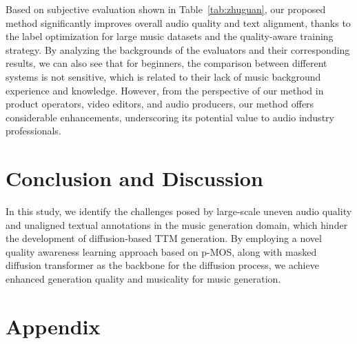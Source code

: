 Based on subjective evaluation shown in Table~\ref{tab:zhuguan}, our proposed method significantly improves overall audio quality and text alignment, thanks to the label optimization for large music datasets and the quality-aware training strategy. By analyzing the backgrounds of the evaluators and their corresponding results, we can also see that for beginners, the comparison between different systems is not sensitive, which is related to their lack of music background experience and knowledge. However, from the perspective of our method in product operators, video editors, and audio producers, our method offers considerable enhancements, underscoring its potential value to audio industry professionals.
\section{Conclusion and Discussion}\label{sec:dis}

In this study, we identify the challenges posed by large-scale uneven audio quality and unaligned textual annotations in the music generation domain, which hinder the development of diffusion-based TTM generation. By employing a novel quality awareness learning approach based on p-MOS, along with masked diffusion transformer as the backbone for the diffusion process, we achieve enhanced generation quality and musicality for music generation.

\clearpage

\appendix
{}

\section{Appendix}

